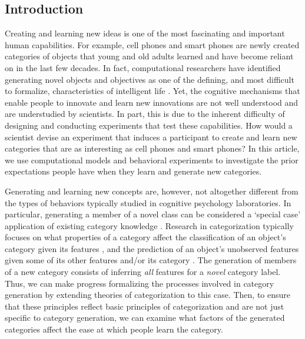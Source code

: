 \documentclass[12pt]{article}
\begin{document}
\begin{flushleft}

\section{Introduction}
\setlength\parindent{0.5in}

Creating and learning new ideas is one of the most fascinating and important human capabilities. For example, cell phones and smart phones are newly created categories of objects that young and old adults learned and have become reliant on in the last few decades. In fact, computational researchers have identified generating novel objects and objectives as one of the defining, and most difficult to formalize, characteristics of intelligent life \citep{lake2017,lehman2011,taylor2016}. Yet, the cognitive mechanisms that enable people to innovate and learn new innovations are not well understood and are understudied by scientists. In part, this is due to the inherent difficulty of designing and conducting experiments that test these capabilities. How would a scientist devise an experiment that induces a participant to create and learn new categories that are as interesting as cell phones and smart phones? In this article, we use computational models and behavioral experiments to investigate the prior expectations people have when they learn and generate new categories.

Generating and learning new concepts are, however, not altogether different from the types of behaviors typically studied in cognitive psychology laboratories. In particular, generating a member of a novel class can be considered a `special case' application of existing category knowledge \citep{kemp2014taxonomy,kurtz2015human}. Research in categorization typically focuses on what properties of a category affect the classification of an object's category given its features \citep{shepard1961learning,kurtz2013human}, and the prediction of an object's unobserved features given some of its other features and/or its category \citep{markman2003category}. The generation of members of a new category consists of inferring {\em all} features for a {\em novel} category label. Thus, we can make progress formalizing the processes involved in category generation by extending theories of categorization to this case. Then, to ensure that these principles reflect basic principles of categorization and are not just specific to category generation, we can examine what factors of the generated categories affect the ease at which people learn the category.


\end{flushleft}
\end{document}
